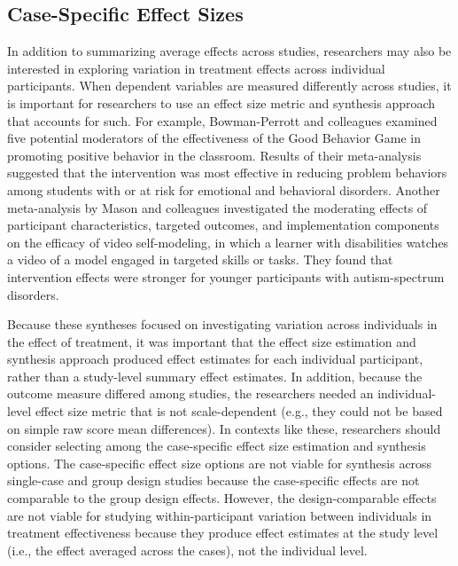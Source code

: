\documentclass[
]{book}
\begin{document}
\hypertarget{case-specific-effect-sizes}{%
\subsection{Case-Specific Effect Sizes}\label{case-specific-effect-sizes}}

In addition to summarizing average effects across studies, researchers may also be interested in exploring variation in treatment effects across individual participants.
When dependent variables are measured differently across studies, it is important for researchers to use an effect size metric and synthesis approach that accounts for such.
For example, Bowman-Perrott and colleagues \citeyearpar{bowman-perrott2016Promoting} examined five potential moderators of the effectiveness of the Good Behavior Game in promoting positive behavior in the classroom.
Results of their meta-analysis suggested that the intervention was most effective in reducing problem behaviors among students with or at risk for emotional and behavioral disorders.
Another meta-analysis by Mason and colleagues \citeyearpar{mason2016Video} investigated the moderating effects of participant characteristics, targeted outcomes, and implementation components on the efficacy of video self-modeling, in which a learner with disabilities watches a video of a model engaged in targeted skills or tasks.
They found that intervention effects were stronger for younger participants with autism-spectrum disorders.

Because these syntheses focused on investigating variation across individuals in the effect of treatment, it was important that the effect size estimation and synthesis approach produced effect estimates for each individual participant, rather than a study-level summary effect estimates.
In addition, because the outcome measure differed among studies, the researchers needed an individual-level effect size metric that is not scale-dependent (e.g., they could not be based on simple raw score mean differences).
In contexts like these, researchers should consider selecting among the case-specific effect size estimation and synthesis options.
The case-specific effect size options are not viable for synthesis across single-case and group design studies because the case-specific effects are not comparable to the group design effects.
However, the design-comparable effects are not viable for studying within-participant variation between individuals in treatment effectiveness because they produce effect estimates at the study level (i.e., the effect averaged across the cases), not the individual level.
\end{document}
